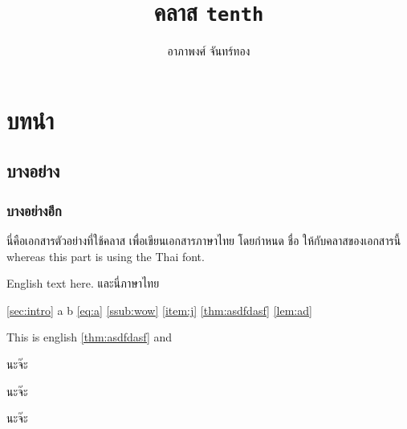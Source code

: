 \usepackage{lipsum}
\title{คลาส \texttt{tenth}}
\author{อาภา{\wbr}พงศ์ จันทร์{\wbr}ทอง}

\newrobustcmd{\codehl}{\texttt}


    \maketitle

    \section{บทนำ \label{sec:intro}}
    \subsection{บาง{\wbr}อย่าง}
    \subsubsection{บาง{\wbr}อย่าง{\wbr}อีก \label{ssub:wow}}

    นี่{\wbr}คือ{\wbr}เอกสาร{\wbr}ตัวอย่าง{\wbr}ที่{\wbr}ใช้{\wbr}คลาส  เพื่อ{\wbr}เขียน{\wbr}เอกสาร{\wbr}ภาษา{\wbr}ไทย โดย{\wbr}กำหนด  ชื่อ  ให้{\wbr}กับ{\wbr}คลาส{\wbr}ของ{\wbr}เอกสาร{\wbr}นี้  whereas this part is using the Thai font.

    \begin{eng}
        English text here. {\tha และ{\wbr}นี่{\wbr}ภาษา{\wbr}ไทย}
    \end{eng}

    \autoref{sec:intro} a \sectionautorefname{} b \autoref{eq:a} \autoref{ssub:wow} \autoref{item:j}
    \Hfootnoteautorefname{} \AMSautorefname{} \autoref{thm:asdfdasf} \autoref{lem:ad} \lemmaautorefname{}

    { This is english \autoref{thm:asdfdasf} and \chaptername}

    \begin{theorem}
        \label{thm:asdfdasf}
        นะ{\wbr}จ๊ะ{\wbr}
    \end{theorem}
    \unskip
    \begin{lemma}
        \label{lem:ad}
        นะ{\wbr}จ๊ะ{\wbr}
    \end{lemma}

    \begin{remark}
        นะ{\wbr}จ๊ะ{\wbr}
    \end{remark}

